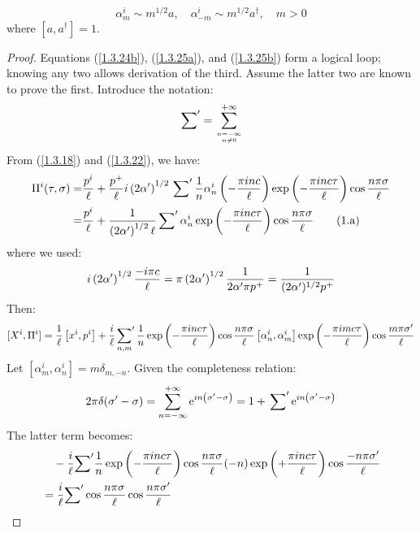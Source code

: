 \begin{equation}
	\alpha_{m}^{i} \sim m^{1 / 2} a, \quad \alpha_{-m}^{i} \sim m^{1 / 2} a^{\dagger}, \quad m>0
\end{equation}
where $[a, a^\dagger]=1$. 
\begin{tcolorbox}[breakable]
	\begin{proof}
		Equations (\ref{1.3.24b}), (\ref{1.3.25a}), and (\ref{1.3.25b}) form a logical loop; knowing any two allows derivation of the third. 
		Assume the latter two are known to prove the first. Introduce the notation:
		\[\sideset{}{'}\sum={\sum_{n=-\infty\atop n \neq 0}^{+\infty} }\]
		From (\ref{1.3.18}) and (\ref{1.3.22}), we have:
		\begin{align}
			\Pi^{i}(\tau, \sigma)
			=&\frac{p^{i}}{\ell}+\frac{p^+}{\ell}i \left(2 \alpha^{\prime}\right)^{1 / 2} \sideset{}{'}\sum \frac{1}{n} \alpha_{n}^{i}\left(-\frac{\pi i n c}{\ell}\right) \exp \left(-\frac{\pi i n c \tau}{\ell}\right) \cos \frac{n \pi \sigma}{\ell} \nonumber \\
			=&\frac{p^ i}{\ell}+\frac{1}{\left(2 \alpha^{\prime}\right)^{1 / 2} \ell} \sideset{}{'}\sum \alpha_{n}^{i} \exp \left(-\frac{\pi i n c\tau}{\ell}\right) \cos \frac{n \pi \sigma}{\ell} \tag{1.a} \label{1.a}
		\end{align}
		where we used:
		\[
		i\left(2 \alpha^{\prime }\right)^{1 / 2} \frac{-i \pi c}{\ell}=\pi\left(2 \alpha^{\prime}\right)^{1 / 2} \frac{1}{2 \alpha^{\prime} \pi p^{+}}=\frac{1}{(2 \alpha^\prime)^{1 / 2} p^{+}}
		\]
		Then:
		\[
		[X^{i} , \Pi^{i}]=\frac{1}{\ell}\left[x^{i} , p^{i}\right]+\frac{i}{\ell } \sideset{}{'}\sum_{n,m} \frac{1}{n} \exp \left(-\frac{\pi i n c \tau}{\ell}\right) \cos \frac{n \pi \sigma}{\ell}
		\left[\alpha_{n}^{i}, \alpha_{m}^{i}\right] \exp \left(-\frac{\pi i m c \tau}{\ell}\right) \cos \frac{m \pi \sigma^\prime}{\ell}
		\]
		Let $\left[\alpha_{m}^{i}, \alpha_{n}^{i}\right]=m \delta_{m,-n}$. Given the completeness relation:
		\[
		2\pi\delta(\sigma^{\prime}-\sigma)=\sum_{n=-\infty}^{+\infty} \mathrm{e}^{ i n\left(\sigma^{\prime}-\sigma\right)}
		=1+\sideset{}{'}\sum \mathrm{e}^{  i n \left(\sigma^{\prime}-\sigma\right)}
		\]
		The latter term becomes:
		\begin{align*}
			&\quad -\frac{\mi}{\ell} {\sum}^\prime \frac{1}{n} \exp \left(-\frac{\pi \mi n c \tau}{\ell}\right) \cos \frac{n \pi \sigma}{\ell}(-n)  \exp \left(+\frac{\pi \mi n c \tau}{\ell}\right) \cos \frac{-n \pi \sigma^\prime}{\ell}\\
			&=\frac{\mi}{\ell} {\sum}^\prime \cos\frac{n \pi \sigma}{\ell} \cos \frac{n \pi \sigma^{\prime}}{\ell} \\

\end{align*}
\end{proof}
\end{tcolorbox}
